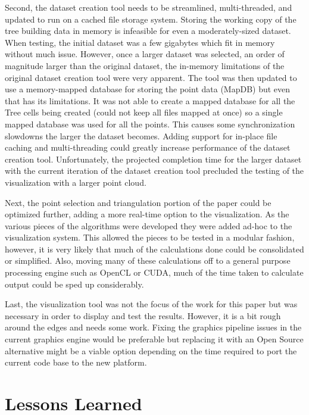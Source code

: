 Second, the dataset creation tool needs to be streamlined, multi-threaded, and updated to run on a cached file storage system. Storing the working copy of the tree building data in memory is infeasible for even a moderately-sized dataset. When testing, the initial dataset was a few gigabytes which fit in memory without much issue. However, once a larger dataset was selected, an order of magnitude larger than the original dataset, the in-memory limitations of the original dataset creation tool were very apparent. The tool was then updated to use a memory-mapped database for storing the point data (MapDB) but even that has its limitations. It was not able to create a mapped database for all the Tree cells being created (could not keep all files mapped at once) so a single mapped database was used for all the points. This causes some synchronization slowdowns the larger the dataset becomes. Adding support for in-place file caching and multi-threading could greatly increase performance of the dataset creation tool. Unfortunately, the projected completion time for the larger dataset with the current iteration of the dataset creation tool precluded the testing of the visualization with a larger point cloud.

Next, the point selection and triangulation portion of the paper could be optimized further, adding a more real-time option to the visualization. As the various pieces of the algorithms were developed they were added ad-hoc to the visualization system. This allowed the pieces to be tested in a modular fashion, however, it is very likely that much of the calculations done could be consolidated or simplified. Also, moving many of these calculations off to a general purpose processing engine such as OpenCL or CUDA, much of the time taken to calculate output could be sped up considerably.

Last, the visualization tool was not the focus of the work for this paper but was necessary in order to display and test the results. However, it is a bit rough around the edges and needs some work. Fixing the graphics pipeline issues in the current graphics engine would be preferable but replacing it with an Open Source alternative might be a viable option depending on the time required to port the current code base to the new platform.

\section{Lessons Learned}

